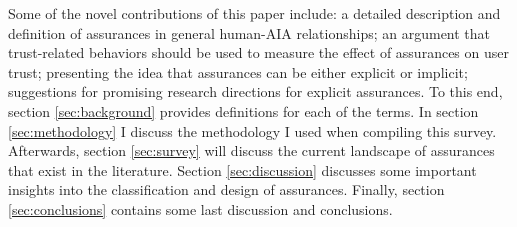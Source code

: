     Some of the novel contributions of this paper include: a detailed description and definition of assurances in general human-AIA relationships; an argument that trust-related behaviors should be used to measure the effect of assurances on user trust; presenting the idea that assurances can be either explicit or implicit; suggestions for promising research directions for explicit assurances.
    To this end, section \ref{sec:background} provides definitions for each of the terms. In section \ref{sec:methodology} I discuss the methodology I used when compiling this survey. Afterwards, section \ref{sec:survey} will discuss the current landscape of assurances that exist in the literature. Section \ref{sec:discussion} discusses some important insights into the classification and design of assurances. Finally, section \ref{sec:conclusions} contains some last discussion and conclusions.
